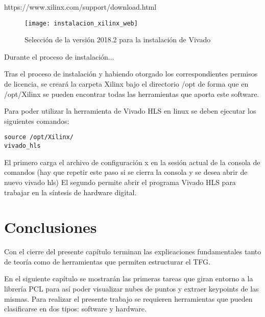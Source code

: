 https://www.xilinx.com/support/download.html

\begin{figure}[!htb]
\centering
{}
  \texttt{[image: instalacion\_xilinx\_web]}
  \caption{Selección de la versión 2018.2 para la instalación de Vivado}\label{fig:instalacion_xilinx_web}
\endminipage\hfill
\end{figure}

Durante el proceso de instalación...


Tras el proceso de instalación y habiendo otorgado los correspondientes permisos de licencia, se creará la carpeta Xilinx bajo el directorio /opt de forma que en /opt/Xilinx se pueden encontrar todas las herramientas que aporta este software.

Para poder utilizar la herramienta de Vivado HLS en linux se deben ejecutar los siguientes comandos:

\begin{verbatim}
source /opt/Xilinx/
vivado_hls
\end{verbatim}
El primero carga el archivo de configuración x en la sesión actual de la consola de comandos (hay que repetir este paso si se cierra la consola y se desea abrir de nuevo vivado hls)
El segundo permite abrir el programa Vivado HLS para trabajar en la síntesis de hardware digital.


\section{Conclusiones}
Con el cierre del presente capítulo terminan las explicaciones fundamentales tanto de teoría como de herramientas que permiten estructurar el TFG.

En el siguiente capítulo se mostrarán las primeras tareas que giran entorno a la librería PCL para así poder visualizar nubes de puntos y extraer keypoints de las mismas.
Para realizar el presente trabajo se requieren herramientas que pueden clasificarse en dos tipos: software y hardware.
